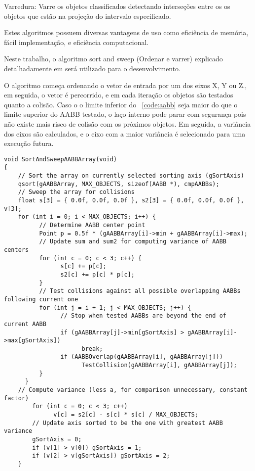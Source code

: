 Varredura: Varre os objetos classificados detectando interseções entre os os
objetos que estão na projeção do intervalo especificado.

Estes algoritmos possuem diversas vantagens de uso como eficiência de memória,
fácil implementação, e eficiência computacional.

Neste trabalho, o algoritmo sort and sweep (Ordenar e varrer) explicado
detalhadamente em  será utilizado para o desenvolvimento.

O algoritmo começa ordenando o vetor de entrada por um dos eixos X, Y ou Z., em
seguida, o vetor é percorrido, e em cada iteração os objetos são testados
quanto a colisão. Caso o o limite inferior do ~\ref{code:aabb} seja maior do
que o limite superior do AABB testado, o laço interno pode parar com segurança
pois não existe mais risco de colisão com os próximos objetos. Em seguida, a
variância dos eixos são calculados, e o eixo com a maior variância é
selecionado para uma execução futura.

\begin{lstlisting}[frame=single,caption=Exemplo de ordenar e varrer\label{code:SortAndSweep}]
void SortAndSweepAABBArray(void)
{
    // Sort the array on currently selected sorting axis (gSortAxis)
    qsort(gAABBArray, MAX_OBJECTS, sizeof(AABB *), cmpAABBs);
    // Sweep the array for collisions
    float s[3] = { 0.0f, 0.0f, 0.0f }, s2[3] = { 0.0f, 0.0f, 0.0f }, v[3];
    for (int i = 0; i < MAX_OBJECTS; i++) {
          // Determine AABB center point
          Point p = 0.5f * (gAABBArray[i]->min + gAABBArray[i]->max);
          // Update sum and sum2 for computing variance of AABB centers
          for (int c = 0; c < 3; c++) {
                s[c] += p[c];
                s2[c] += p[c] * p[c];
          }
          // Test collisions against all possible overlapping AABBs following current one
          for (int j = i + 1; j < MAX_OBJECTS; j++) {
                // Stop when tested AABBs are beyond the end of current AABB
                if (gAABBArray[j]->min[gSortAxis] > gAABBArray[i]->max[gSortAxis])
                      break;
                if (AABBOverlap(gAABBArray[i], gAABBArray[j]))
                      TestCollision(gAABBArray[i], gAABBArray[j]);
          }
      }
    // Compute variance (less a, for comparison unnecessary, constant factor)
        for (int c = 0; c < 3; c++)
              v[c] = s2[c] - s[c] * s[c] / MAX_OBJECTS;
        // Update axis sorted to be the one with greatest AABB variance
        gSortAxis = 0;
        if (v[1] > v[0]) gSortAxis = 1;
        if (v[2] > v[gSortAxis]) gSortAxis = 2;
    }
\end{lstlisting}

